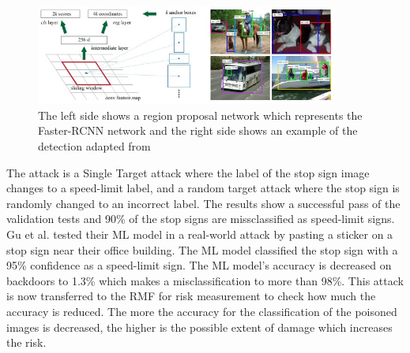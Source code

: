 \begin{figure}[ht!]
  \centering
  \includegraphics[width=10cm]{pictures/f_rcnn.jpg}
  \caption{The left side shows a region proposal network which represents the Faster-RCNN network and the right side shows an example of the detection adapted from \cite{DBLP:conf/nips/RenHGS15}}
  \label{fig:f_rcnn}
\end{figure}

The attack is a Single Target attack where the label of the stop sign image changes to a speed-limit label, and a random target attack where the stop sign is randomly changed to an incorrect label. The results show a successful pass of the validation tests and 90\% of the stop signs are missclassified as speed-limit signs. Gu et al. tested their ML model in a real-world attack by pasting a sticker on a stop sign near their office building. The ML model classified the stop sign with a 95\% confidence as a speed-limit sign. The ML model's accuracy is decreased on backdoors to 1.3\% which makes a misclassification to more than 98\%. This attack is now transferred to the RMF for risk measurement to check how much the accuracy is reduced. The more the accuracy for the classification of the poisoned images is decreased, the higher is the possible extent of damage which increases the risk. \\ \\

